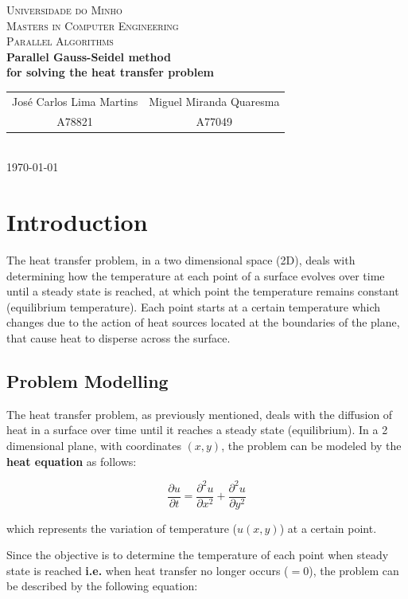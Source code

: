 \documentclass{article}
\begin{document}
{
\center
\textsc{\Large Universidade do Minho} \\ [0.5cm]
\textsc{\Large Masters in Computer Engineering} \\ [0.5cm]
\textsc{\large Parallel Algorithms} \\ [0.5cm]

{\LARGE \bfseries Parallel Gauss-Seidel method} \\[0.2cm]
{\LARGE \bfseries for solving the heat transfer problem} \\[0.5cm]

\begin{tabular}{c c}
    José Carlos Lima Martins & Miguel Miranda Quaresma \\
    A78821 & A77049  \\
\end{tabular} \\[0.5cm]

\today \\[1cm]
}

\section{Introduction}

The heat transfer problem, in a two dimensional space (2D), deals with determining how the temperature at each point of a surface evolves over time
until a steady state is reached, at which point the temperature remains constant (equilibrium temperature). 
Each point starts at a certain temperature which changes due to the action of heat sources located at the boundaries of the plane, that cause heat to
disperse across the surface.

\subsection{Problem Modelling}
The heat transfer problem, as previously mentioned, deals with the diffusion of heat in a surface over time until it reaches a steady state (equilibrium). 
In a 2 dimensional plane, with coordinates $(x,y)$, the problem can be modeled by the \textbf{heat equation} as follows:

$$\frac{\partial u}{\partial t} = \frac{\partial^2u}{\partial x^2} + \frac{\partial^2u}{\partial y^2}$$

which represents the variation of temperature ($u(x,y)$) at a certain point.

Since the objective is to determine the temperature of each point when steady state is reached \textbf{i.e.} when heat transfer no longer 
occurs ($=0$), the problem can be described by the following equation:
\end{document}
